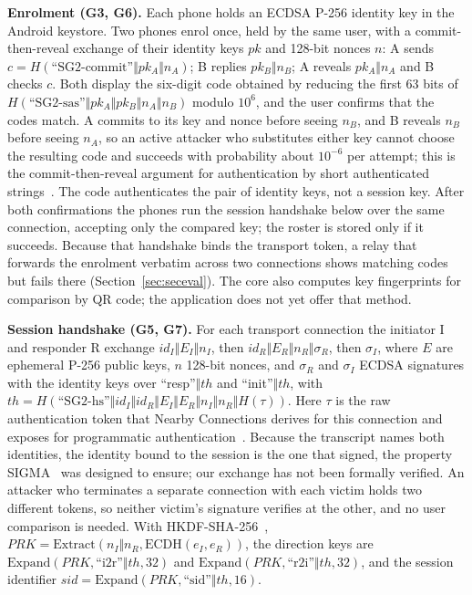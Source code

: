 \documentclass[conference]{IEEEtran}
\begin{document}
\textbf{Enrolment (G3, G6).} Each phone holds an ECDSA P-256 identity key in the Android keystore. Two phones enrol once, held by the same user, with a commit-then-reveal exchange of their identity keys $pk$ and 128-bit nonces $n$: A sends $c = H(\text{``SG2-commit''} \Vert pk_A \Vert n_A)$; B replies $pk_B \Vert n_B$; A reveals $pk_A \Vert n_A$ and B checks $c$. Both display the six-digit code obtained by reducing the first 63 bits of $H(\text{``SG2-sas''} \Vert pk_A \Vert pk_B \Vert n_A \Vert n_B)$ modulo $10^6$, and the user confirms that the codes match. A commits to its key and nonce before seeing $n_B$, and B reveals $n_B$ before seeing $n_A$, so an active attacker who substitutes either key cannot choose the resulting code and succeeds with probability about $10^{-6}$ per attempt; this is the commit-then-reveal argument for authentication by short authenticated strings~\cite{vaudenay2005}. The code authenticates the pair of identity keys, not a session key. After both confirmations the phones run the session handshake below over the same connection, accepting only the compared key; the roster is stored only if it succeeds. Because that handshake binds the transport token, a relay that forwards the enrolment verbatim across two connections shows matching codes but fails there (Section~\ref{sec:seceval}). The core also computes key fingerprints for comparison by QR code; the application does not yet offer that method.

\textbf{Session handshake (G5, G7).} For each transport connection the initiator I and responder R exchange $\textit{id}_I \Vert E_I \Vert n_I$, then $\textit{id}_R \Vert E_R \Vert n_R \Vert \sigma_R$, then $\sigma_I$, where $E$ are ephemeral P-256 public keys, $n$ 128-bit nonces, and $\sigma_R$ and $\sigma_I$ ECDSA signatures with the identity keys over ``resp''$\Vert th$ and ``init''$\Vert th$, with
$th = H(\text{``SG2-hs''} \Vert \textit{id}_I \Vert \textit{id}_R \Vert E_I \Vert E_R \Vert n_I \Vert n_R \Vert H(\tau))$.
Here $\tau$ is the raw authentication token that Nearby Connections derives for this connection and exposes for programmatic authentication~\cite{nearbydocs}. Because the transcript names both identities, the identity bound to the session is the one that signed, the property SIGMA~\cite{sigma2003} was designed to ensure; our exchange has not been formally verified. An attacker who terminates a separate connection with each victim holds two different tokens, so neither victim's signature verifies at the other, and no user comparison is needed. With HKDF-SHA-256~\cite{rfc5869}, $PRK = \mathrm{Extract}(n_I \Vert n_R, \mathrm{ECDH}(e_I, e_R))$, the direction keys are $\mathrm{Expand}(PRK, \text{``i2r''} \Vert th, 32)$ and $\mathrm{Expand}(PRK, \text{``r2i''} \Vert th, 32)$, and the session identifier $sid = \mathrm{Expand}(PRK, \text{``sid''} \Vert th, 16)$.
\end{document}
